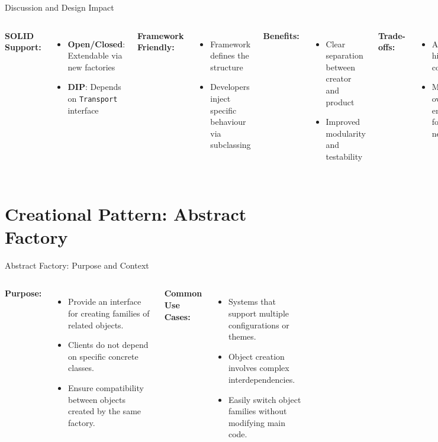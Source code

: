 \documentclass[aspectratio=169, table]{beamer}
\begin{document}
\begin{frame}[fragile]{Discussion and Design Impact}
\vspace{5pt}
\begin{columns}[T]
\textbf{SOLID Support:}
\begin{itemize}
\item \textbf{Open/Closed}: Extendable via new factories
\item \textbf{DIP}: Depends on \texttt{Transport} interface
\end{itemize}

\textbf{Framework Friendly:}
\begin{itemize}
\item Framework defines the structure
\item Developers inject specific behaviour via subclassing
\end{itemize}

\textbf{Benefits:}
\begin{itemize}
\item Clear separation between creator and product
\item Improved modularity and testability
\end{itemize}

\textbf{Trade-offs:}
\begin{itemize}
\item Adds class hierarchy complexity
\item May feel over-engineered for simple needs
\end{itemize}
\end{columns}
\end{frame}


\section{Creational Pattern: Abstract Factory}

\begin{frame}[fragile]{Abstract Factory: Purpose and Context}
\vspace{5pt}
\begin{columns}[T]
\textbf{Purpose:}
\begin{itemize}
\item Provide an interface for creating families of related objects.
\item Clients do not depend on specific concrete classes.
\item Ensure compatibility between objects created by the same factory.
\end{itemize}

\textbf{Common Use Cases:}
\begin{itemize}
\item Systems that support multiple configurations or themes.
\item Object creation involves complex interdependencies.
\item Easily switch object families without modifying main code.
\end{itemize}
\end{columns}
\end{frame}
\end{document}
